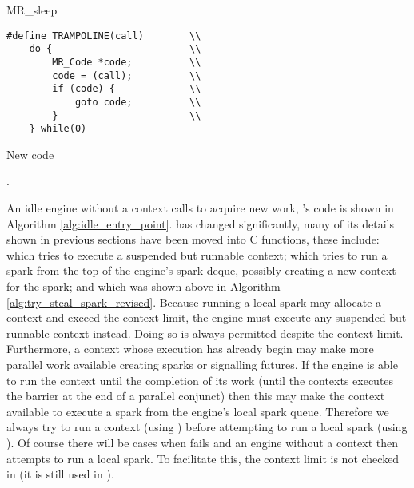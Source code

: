 \begin{algorithm}[tbp]
\begin{multicols}{2}

\parbox{\textwidth}{
\begin{algorithmic}
        \State {}
        \State {}
        \State {}
        \Goto MR\_sleep
    \EndProcedure
\end{algorithmic}
}

\begin{minipage}{\textwidth}
\begin{verbatim}
#define TRAMPOLINE(call)        \\
    do {                        \\
        MR_Code *code;          \\
        code = (call);          \\
        if (code) {             \\
            goto code;          \\
        }                       \\
    } while(0)
\end{verbatim}
\end{minipage}

\end{multicols}
\caption{New \idle code}
\label{alg:idle_entry_point}
\end{algorithm}

.

An idle engine without a context calls \idle to acquire new work,
\idle's code is shown in Algorithm \ref{alg:idle_entry_point}.
\idle has changed significantly,
many of its details shown in previous sections have been moved into C
functions,
these include:
\tryruncontext which tries to execute a suspended but runnable context;
\tryrunlocalspark which tries to run a spark from the top of the engine's
spark deque, possibly creating a new context for the spark;
and 
\trystealspark which was shown above in Algorithm
\ref{alg:try_steal_spark_revised}.
Because running a local spark may allocate a context and exceed the context
limit,
the engine must execute any suspended but runnable context instead.
Doing so is always permitted despite the context limit.
Furthermore,
a context whose execution has already begin may make more parallel work
available creating sparks or signalling futures.
If the engine is able to run the context until the completion of its work
(until the contexts executes the \joinandcontinue barrier at the end of a
parallel conjunct)
then this may make the context available to execute a spark from the
engine's local spark queue.
Therefore we always try to run a context (using \tryruncontext)
before attempting to run a local spark (using \tryrunlocalspark).
Of course there will be cases when \tryruncontext fails and an engine
without a context then attempts to run a local spark.
To facilitate this, the context limit is not checked in \tryrunlocalspark
(it is still used in \trystealspark).

